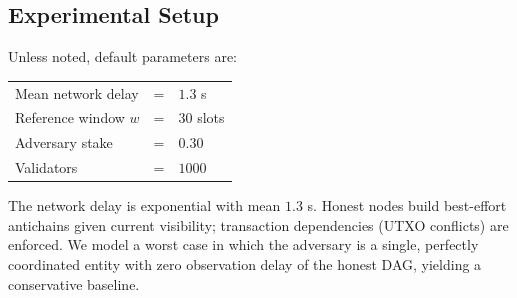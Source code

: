 \subsection{Experimental Setup}
Unless noted, default parameters are:
\begin{center}
\begin{tabular}{lcl}
\toprule
Mean network delay & = & $1.3$ s\\
Reference window $w$ & = & $30$ slots\\
Adversary stake & = & $0.30$ \\
Validators & = & $1000$ \\
\bottomrule
\end{tabular}
\end{center}

The network delay is exponential with mean $1.3$ s. Honest nodes build best-effort antichains given current visibility; transaction dependencies (UTXO conflicts) are enforced. We model a worst case in which the adversary is a single, perfectly coordinated entity with zero observation delay of the honest DAG, yielding a conservative baseline.


